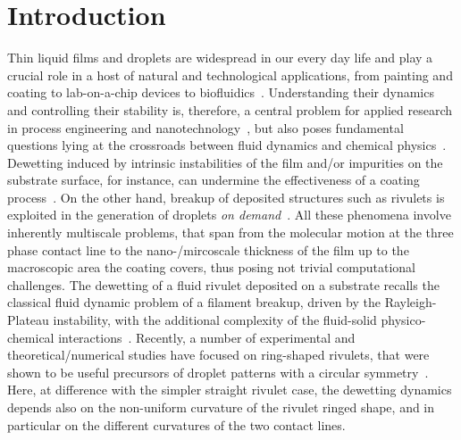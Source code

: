 \documentclass[twoside,twocolumn,9pt]{article}
\begin{document}
\section{Introduction}
\label{sec:intro}
Thin liquid films and droplets are widespread in our every day life and play a crucial role in a host of natural and technological applications, from painting and coating to lab-on-a-chip devices to biofluidics~\cite{degennesCapillarityWettingPhenomena2004, ronsinPhaseFieldSimulationsMorphology2022,fockeLabonaFoilMicrofluidicsThin2010}.
Understanding their dynamics and controlling their stability is, therefore, a central problem for applied research in process engineering and nanotechnology~\cite{singhInkjetPrintingProcess2010, quereFluidCoatingFiber1999, utadaDrippingJettingDrops2007}, but also poses fundamental questions lying at the crossroads between fluid dynamics and chemical physics~\cite{oronLongscaleEvolutionThin1997, beckerComplexDewettingScenarios2003, thielePatternedDepositionMoving2014, wilczekSlidingDropsEnsemble2017, peschkaSignaturesSlipDewetting2019}.
Dewetting induced by intrinsic instabilities of the film and/or impurities on the substrate surface, for instance, can undermine the effectiveness of a coating process~\cite{bonnWettingSpreading2009, chenWrinklingInstabilitiesPolymer2012}. 
On the other hand, breakup of deposited structures such as rivulets is exploited in the generation of droplets {\it on demand}~\cite{}.
All these phenomena involve inherently multiscale problems, that span from the molecular motion at the three phase contact line to the nano-/mircoscale thickness of the film up to the macroscopic area the coating covers, thus posing not trivial computational challenges.
The dewetting of a fluid rivulet deposited on a substrate recalls the classical fluid dynamic problem of a filament breakup, driven by the Rayleigh-Plateau instability, with the additional complexity of the fluid-solid physico-chemical interactions~\cite{diezBreakupFluidRivulets2009, diezStabilityFinitelengthRivulet2009, diezInstabilityTransverseLiquid2012}.
Recently,  a number of experimental and theoretical/numerical studies have focused on ring-shaped rivulets, that were shown to be useful precursors of droplet patterns with a circular symmetry~\cite{nguyenCompetitionCollapseBreakup2012, gonzalezStabilityLiquidRing2013, wuCompetingLiquidPhase2011, edwardsControllingBreakupToroidal2021}. 
Here, at difference with the simpler straight rivulet case, the dewetting dynamics depends also on the non-uniform curvature of the rivulet ringed shape, and in particular on the different curvatures of the two contact lines.
\end{document}
